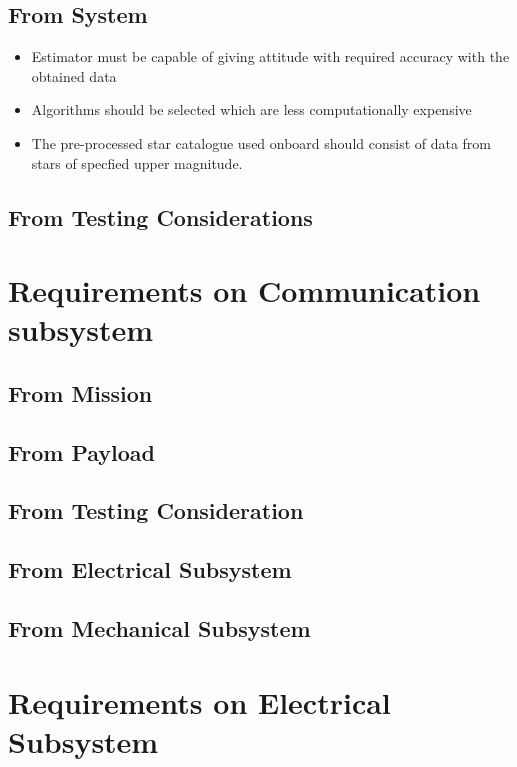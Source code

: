\documentclass[../../main.tex]{subfiles}
\begin{document}
\subsection{From System}
\begin{itemize}
    \item Estimator must be capable of giving attitude with required accuracy with the obtained data
    \item Algorithms should be selected which are less computationally expensive
    \item The pre-processed star catalogue used onboard should consist of data from stars of specfied upper magnitude.
\end{itemize}
\subsection{From Testing Considerations}


\newpage
\section{Requirements on Communication subsystem}
\subsection{From Mission}
\subsection{From Payload}
\subsection{From Testing Consideration}
\subsection{From Electrical Subsystem}
\subsection{From Mechanical Subsystem}


\newpage
\section{Requirements on Electrical Subsystem}
\end{document}
